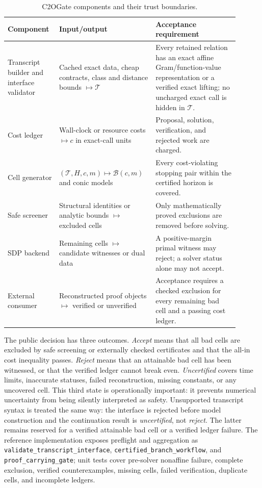 \documentclass[smallextended]{svjour3}
\newcommand{\cT}{\mathcal{T}}
\begin{document}
\begin{table}[htbp]
\centering
\scriptsize
\setlength{\tabcolsep}{4pt}
\caption{C2OGate components and their trust boundaries.}
\label{tab:software-contract}
\begin{tabular}{P{0.20\linewidth}P{0.36\linewidth}P{0.34\linewidth}}
\toprule
Component & Input/output & Acceptance requirement\\
\midrule
Transcript builder and interface validator & Cached exact data, cheap
contracts, class and distance bounds $\mapsto\cT$ & Every retained relation
has an exact affine Gram/function-value representation or a verified exact
lifting; no uncharged exact call is hidden in $\cT$.\\
Cost ledger & Wall-clock or resource costs $\mapsto c$ in exact-call units &
Proposal, solution, verification, and rejected work are charged.\\
Cell generator & $(\cT,H,c,m)\mapsto\mathcal B(c,m)$ and conic models &
Every cost-violating stopping pair within the certified horizon is covered.\\
Safe screener & Structural identities or analytic bounds $\mapsto$ excluded
cells & Only mathematically proved exclusions are removed before solving.\\
SDP backend & Remaining cells $\mapsto$ candidate witnesses or dual data &
A positive-margin primal witness may reject; a solver status alone may not
accept.\\
External consumer & Reconstructed proof objects $\mapsto$ verified or
unverified & Acceptance requires a checked exclusion for every remaining bad
cell and a passing cost ledger.\\
\bottomrule
\end{tabular}
\end{table}

The public decision has three outcomes.  \emph{Accept} means that all bad
cells are excluded by safe screening or externally checked certificates
and that the all-in cost inequality passes.  \emph{Reject} means that an
attainable bad cell has been witnessed, or that the verified ledger cannot
break even.  \emph{Uncertified} covers time limits, inaccurate statuses,
failed reconstruction, missing constants, or any uncovered cell.  This third
state is operationally important: it prevents numerical uncertainty from
being silently interpreted as safety.
Unsupported transcript syntax is treated the same way: the interface is
rejected before model construction and the continuation result is
\emph{uncertified}, not \emph{reject}.  The latter remains reserved for a
verified attainable bad cell or a verified ledger failure.
The reference implementation exposes preflight and aggregation as
\texttt{validate\_transcript\_interface},
\texttt{certified\_branch\_workflow}, and
\texttt{proof\_carrying\_gate}; unit tests cover pre-solver nonaffine failure,
complete exclusion,
verified counterexamples, missing cells, failed verification, duplicate cells,
and incomplete ledgers.
\end{document}
